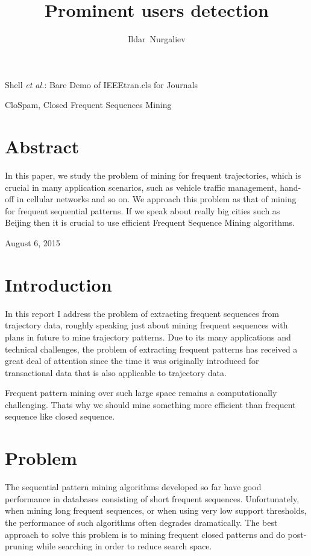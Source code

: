 \documentclass[journal]{IEEEtran}
\begin{document}
\title{Prominent users detection}

\author{Ildar~Nurgaliev}


%
{Shell \MakeLowercase{\textit{et al.}}: Bare Demo of IEEEtran.cls for Journals}

\maketitle

\begin{IEEEkeywords}
CloSpam, Closed Frequent Sequences Mining 
\end{IEEEkeywords}

\IEEEpeerreviewmaketitle

\section{Abstract}
In this paper, we study the problem of mining for frequent trajectories, which is crucial in many application scenarios, such as vehicle traffic management, hand-off in cellular networks and so on. We approach this problem as that of mining for frequent sequential patterns. If we speak about really big cities such as Beijing then it is crucial to use efficient Frequent Sequence Mining algorithms.

\hfill August 6, 2015

\section{Introduction}
In this report I address the problem of extracting frequent sequences from trajectory data, roughly speaking just about mining frequent sequences with plans in future to mine trajectory patterns. Due to its many applications and technical challenges, the problem of extracting frequent patterns has received a great deal of attention since the time it was originally introduced for transactional data that is also applicable to trajectory data.
\par Frequent pattern mining over such large space remains a computationally challenging. Thats why we should mine something more efficient than frequent sequence like closed sequence.

\section{Problem}
The sequential pattern mining algorithms developed so far have good performance in databases consisting of short frequent sequences. Unfortunately, when mining long frequent sequences, or when using very low support thresholds, the performance of such algorithms often degrades dramatically. The best approach to solve this problem is to mining frequent closed patterns and do post-pruning while searching in order to reduce search space.
\end{document}
